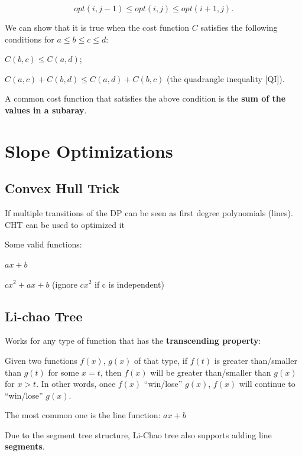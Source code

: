         $$opt(i, j-1) \leq opt(i, j) \leq opt(i+1, j).$$

        We can show that it is true when the cost function 
        $C$ satisfies the following conditions for $a \leq b \leq c \leq d$:

        $C(b, c) \leq C(a, d)$;

        $C(a, c) + C(b, d) \leq C(a, d) + C(b, c)$ (the quadrangle inequality [QI]).

        A common cost function that satisfies the above condition is the \textbf{sum of the values in a subaray}.


\section{Slope Optimizations}

    \subsection{Convex Hull Trick}

        If multiple transitions of the DP can be seen as 
        first degree polynomials (lines). CHT can be used to optimized it

        Some valid functions:

        $ax + b$
        
        $cx^2 + ax + b$ 
        (ignore $cx^2$ if c is independent)


    \subsection{Li-chao Tree}

        Works for any type of function that has the \textbf{transcending property}:

        Given two functions $f(x)$, $g(x)$ of that type, 
        if $f(t)$ is greater than/smaller than $g(t)$ for some $x=t$,
        then $f(x)$ will be greater than/smaller than $g(x)$ for $x>t$.
        In other words, once $f(x)$ “win/lose” $g(x)$, $f(x)$ will continue to “win/lose” $g(x)$.

        The most common one is the line function: $ax + b$

        Due to the segment tree structure, Li-Chao tree also supports adding line \textbf{segments}.

